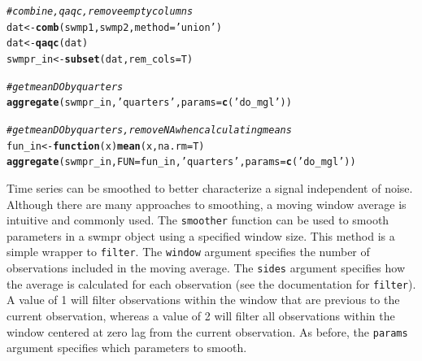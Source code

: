 \documentclass[10pt,letterpaper]{article}\usepackage[]{graphicx}\usepackage[]{color}
\makeatletter
\newcommand{\hlstr}[1]{\textcolor[rgb]{0.192,0.494,0.8}{#1}}%
\newcommand{\hlcom}[1]{\textcolor[rgb]{0.678,0.584,0.686}{\textit{#1}}}%
\newcommand{\hlstd}[1]{\textcolor[rgb]{0.345,0.345,0.345}{#1}}%
\newcommand{\hlkwa}[1]{\textcolor[rgb]{0.161,0.373,0.58}{\textbf{#1}}}%
\newcommand{\hlkwb}[1]{\textcolor[rgb]{0.69,0.353,0.396}{#1}}%
\newcommand{\hlkwc}[1]{\textcolor[rgb]{0.333,0.667,0.333}{#1}}%
\newcommand{\hlkwd}[1]{\textcolor[rgb]{0.737,0.353,0.396}{\textbf{#1}}}%
\newenvironment{kframe}{%
 \def\at@end@of@kframe{}%
 \ifinner\ifhmode%
  \def\at@end@of@kframe{\end{minipage}}%
  \begin{minipage}{\columnwidth}%
 \fi\fi%
 \def\FrameCommand##1{\hskip\@totalleftmargin \hskip-\fboxsep
 \colorbox{shadecolor}{##1}\hskip-\fboxsep
     \hskip-\linewidth \hskip-\@totalleftmargin \hskip\columnwidth}%
 \MakeFramed {\advance\hsize-\width
   \@totalleftmargin\z@ \linewidth\hsize
   \@setminipage}}%
 {\par\unskip\endMakeFramed%
 \at@end@of@kframe}
\newenvironment{knitrout}{}{} %
\makeatother
\begin{document}
\begin{knitrout}
\color{fgcolor}\begin{kframe}
\begin{alltt}
\hlcom{# combine, qaqc, remove empty columns}
\hlstd{dat} \hlkwb{<-} \hlkwd{comb}\hlstd{(swmp1, swmp2,} \hlkwc{method} \hlstd{=} \hlstr{'union'}\hlstd{)}
\hlstd{dat} \hlkwb{<-} \hlkwd{qaqc}\hlstd{(dat)}
\hlstd{swmpr_in} \hlkwb{<-} \hlkwd{subset}\hlstd{(dat,} \hlkwc{rem_cols} \hlstd{= T)}

\hlcom{# get mean DO by quarters}
\hlkwd{aggregate}\hlstd{(swmpr_in,} \hlstr{'quarters'}\hlstd{,} \hlkwc{params} \hlstd{=} \hlkwd{c}\hlstd{(}\hlstr{'do_mgl'}\hlstd{))}

\hlcom{# get mean DO by quarters, remove NA when calculating means}
\hlstd{fun_in} \hlkwb{<-} \hlkwa{function}\hlstd{(}\hlkwc{x}\hlstd{)} \hlkwd{mean}\hlstd{(x,} \hlkwc{na.rm} \hlstd{= T)}
\hlkwd{aggregate}\hlstd{(swmpr_in,} \hlkwc{FUN} \hlstd{= fun_in,} \hlstr{'quarters'}\hlstd{,} \hlkwc{params} \hlstd{=} \hlkwd{c}\hlstd{(}\hlstr{'do_mgl'}\hlstd{))}
\end{alltt}
\end{kframe}
\end{knitrout}

Time series can be smoothed to better characterize a signal independent of noise.  Although there are many approaches to smoothing, a moving window average is intuitive and commonly used.  The \texttt{smoother} function can be used to smooth parameters in a swmpr object using a specified window size.  This method is a simple wrapper to \texttt{filter}.  The \texttt{window} argument specifies the number of observations included in the moving average.  The \texttt{sides} argument specifies how the average is calculated for each observation (see the documentation for \texttt{filter}).  A value of 1 will filter observations within the window that are previous to the current observation, whereas a value of 2 will filter all observations within the window centered at zero lag from the current observation. As before, the \texttt{params} argument specifies which parameters to smooth.
\end{document}
